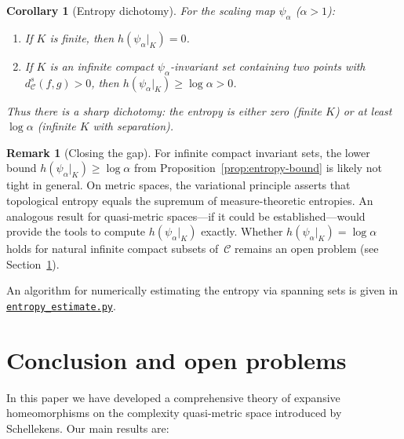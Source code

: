 \documentclass[11pt,a4paper]{article}
\newcommand{\repourl}{https://github.com/guydev42/expansive-homeomorphisms-complexity-qmetric}
\theoremstyle{plain}
\newtheorem{corollaryinner}[theoreminner]{Corollary}
\theoremstyle{definition}
\newtheorem{remarkinner}[theoreminner]{Remark}
\newenvironment{corollary}[1][]{\begin{corollaryinner}[#1]}{\end{corollaryinner}}
\newenvironment{remark}[1][]{\begin{remarkinner}[#1]}{\end{remarkinner}}
\newcommand{\C}{\mathcal{C}}
\begin{document}
\begin{corollary}[Entropy dichotomy]\label{cor:entropy-dichotomy}
For the scaling map $\psi_\alpha$ ($\alpha>1$):
\begin{enumerate}[label=\textup{(\roman*)}]
  \item If $K$ is finite, then $h(\psi_\alpha|_K)=0$.
  \item If $K$ is an infinite compact $\psi_\alpha$-invariant set
    containing two points with $d_\C^s(f,g)>0$, then
    $h(\psi_\alpha|_K)\ge\log\alpha>0$.
\end{enumerate}
Thus there is a sharp dichotomy: the entropy is either zero (finite
$K$) or at least $\log\alpha$ (infinite $K$ with separation).
\end{corollary}

\begin{remark}[Closing the gap]\label{rem:entropy-gap}
For infinite compact invariant sets, the lower bound
$h(\psi_\alpha|_K)\ge\log\alpha$ from
Proposition~\ref{prop:entropy-bound} is likely not tight in general.
On metric spaces, the variational principle asserts that topological
entropy equals the supremum of measure-theoretic entropies.  An
analogous result for quasi-metric spaces---if it could be
established---would provide the tools to compute
$h(\psi_\alpha|_K)$ exactly.  Whether $h(\psi_\alpha|_K)=\log\alpha$
holds for natural infinite compact subsets of~$\C$ remains an open
problem (see Section~\ref{sec:conclusion}).
\end{remark}

An algorithm for numerically estimating the entropy via spanning
sets is given in
\href{\repourl/blob/main/code/python/entropy_estimate.py}{\texttt{entropy\_estimate.py}}.


\section{Conclusion and open problems}
\label{sec:conclusion}

In this paper we have developed a comprehensive theory of expansive
homeomorphisms on the complexity quasi-metric space introduced by
Schellekens.  Our main results are:
\end{document}
